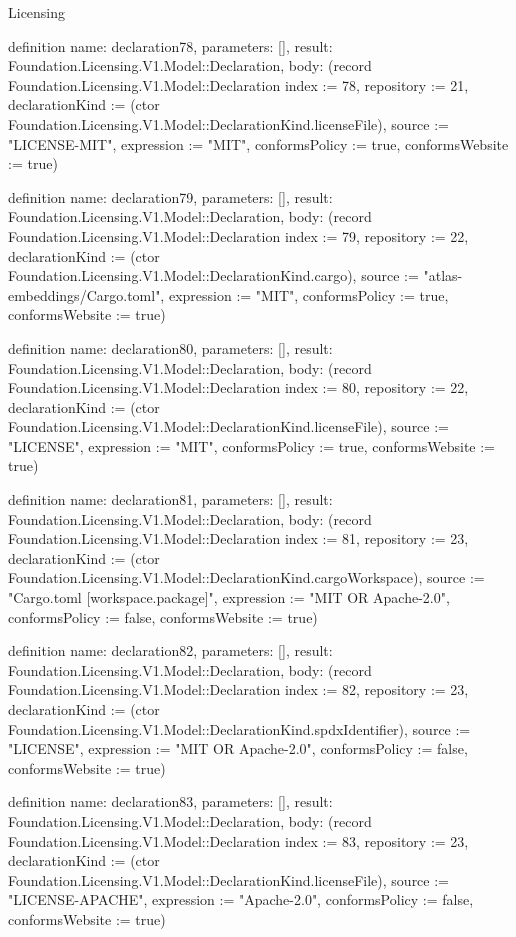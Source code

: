 \begin{lexlean}{Licensing}
\begin{semanticmodule}
definition{
  name: declaration78,
  parameters: [],
  result: Foundation.Licensing.V1.Model::Declaration,
  body: (record Foundation.Licensing.V1.Model::Declaration {index := 78, repository := 21, declarationKind := (ctor Foundation.Licensing.V1.Model::DeclarationKind.licenseFile), source := "LICENSE-MIT", expression := "MIT", conformsPolicy := true, conformsWebsite := true})
}

definition{
  name: declaration79,
  parameters: [],
  result: Foundation.Licensing.V1.Model::Declaration,
  body: (record Foundation.Licensing.V1.Model::Declaration {index := 79, repository := 22, declarationKind := (ctor Foundation.Licensing.V1.Model::DeclarationKind.cargo), source := "atlas-embeddings/Cargo.toml", expression := "MIT", conformsPolicy := true, conformsWebsite := true})
}

definition{
  name: declaration80,
  parameters: [],
  result: Foundation.Licensing.V1.Model::Declaration,
  body: (record Foundation.Licensing.V1.Model::Declaration {index := 80, repository := 22, declarationKind := (ctor Foundation.Licensing.V1.Model::DeclarationKind.licenseFile), source := "LICENSE", expression := "MIT", conformsPolicy := true, conformsWebsite := true})
}

definition{
  name: declaration81,
  parameters: [],
  result: Foundation.Licensing.V1.Model::Declaration,
  body: (record Foundation.Licensing.V1.Model::Declaration {index := 81, repository := 23, declarationKind := (ctor Foundation.Licensing.V1.Model::DeclarationKind.cargoWorkspace), source := "Cargo.toml [workspace.package]", expression := "MIT OR Apache-2.0", conformsPolicy := false, conformsWebsite := true})
}

definition{
  name: declaration82,
  parameters: [],
  result: Foundation.Licensing.V1.Model::Declaration,
  body: (record Foundation.Licensing.V1.Model::Declaration {index := 82, repository := 23, declarationKind := (ctor Foundation.Licensing.V1.Model::DeclarationKind.spdxIdentifier), source := "LICENSE", expression := "MIT OR Apache-2.0", conformsPolicy := false, conformsWebsite := true})
}

definition{
  name: declaration83,
  parameters: [],
  result: Foundation.Licensing.V1.Model::Declaration,
  body: (record Foundation.Licensing.V1.Model::Declaration {index := 83, repository := 23, declarationKind := (ctor Foundation.Licensing.V1.Model::DeclarationKind.licenseFile), source := "LICENSE-APACHE", expression := "Apache-2.0", conformsPolicy := false, conformsWebsite := true})
}


\end{semanticmodule}
\end{lexlean}
